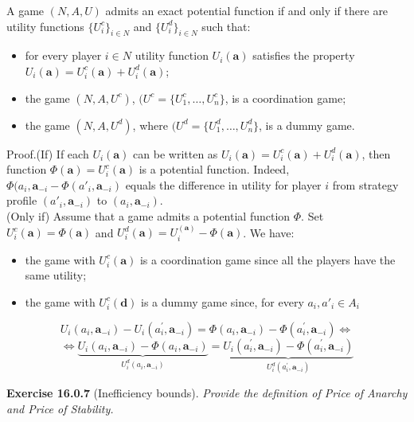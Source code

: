 A game $(N,A,U)$ admits an exact potential function if and only if there are utility functions $\{U_i^c\}_{i \in N}$ and $\{U_i^d\}_{i \in N}$ such that:
\begin{itemize}
\item for every player $i \in N$ utility function $U_i(\mathbf{a})$ satisfies the property $U_i(\mathbf{a})= U_i^c(\mathbf{a}) + U_i^d(\mathbf{a})$;
\item the game $(N,A,U^c)$, $(U^c = \{U_1^c, \ldots, U_n^c\}$, is a coordination game;
\item the game $(N,A,U^d)$, where $(U^d = \{U_1^d, \ldots, U_n^d\}$, is a dummy game.
\end{itemize}
Proof.(If) If each $U_i(\mathbf{a})$ can be written as $U_i(\mathbf{a}) = U_i^c(\mathbf{a}) + U_i^d(\mathbf{a})$, then function $\Phi(\mathbf{a}) = U_i^c(\mathbf{a})$ is a potential function. Indeed, $\Phi (a_i, \mathbf{a}_{-i} - \Phi (a'_i, \mathbf{a}_{-i})$ equals the difference in utility for player $i$ from strategy profile $(a'_i, \mathbf{a}_{-i})$ to $(a_i, \mathbf{a}_{-i})$.\\
(Only if) Assume that a game admits a potential function $\Phi$. Set $U_i^c(\mathbf{a})= \Phi(\mathbf{a})$ and $U_i^d(\mathbf{a}) = U_i^(\mathbf{a}) - \Phi(\mathbf{a})$. We have:
\begin{itemize}
\item the game with $U_i^c(\mathbf{a})$ is a coordination game since all the players have the same utility; 
\item the game with $U_i^c(\mathbf{d})$ is a dummy game since, for every $a_i, a'_i \in A_i$
\end{itemize}
$$U_{i}\left(a_{i}, \mathbf{a}_{-i}\right)-U_{i}\left(a_{i}^{\prime}, \mathbf{a}_{-i}\right)=\Phi\left(a_{i}, \mathbf{a}_{-i}\right)-\Phi\left(a_{i}^{\prime}, \mathbf{a}_{-i}\right) \Leftrightarrow $$
$$ \Leftrightarrow \underbrace{U_{i}\left(a_{i}, \mathbf{a}_{-i}\right)-\Phi\left(a_{i}, \mathbf{a}_{-i}\right)}_{U_{i}^{d}\left(a_{i}, \mathbf{a}_{-i}\right)}=\underbrace{U_{i}\left(a_{i}^{\prime}, \mathbf{a}_{-i}\right)-\Phi\left(a_{i}^{\prime}, \mathbf{a}_{-i}\right)}_{U_{i}^{d}\left(a_{i}^{\prime}, \mathbf{a}_{-i}\right)}$$

\textbf{Exercise 16.0.7} (Inefficiency bounds). \textit{Provide the definition of Price of Anarchy and Price of Stability.}\\

